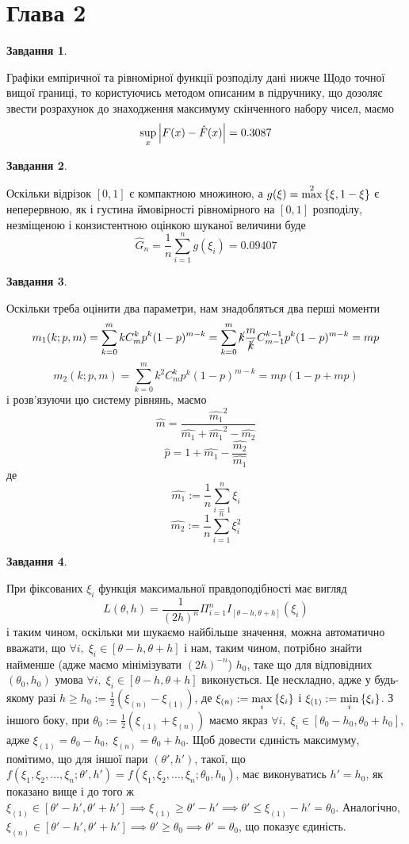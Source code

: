 \documentclass[12pt]{article} %
\newtheorem{prob}{Завдання}
\begin{document}
\section{Глава 2}
\setcounter{prob}{40}
\begin{prob}\end{prob}
	Графіки емпіричної та рівномірної функції розподілу дані нижче
	Щодо точної вищої границі, то користуючись методом описаним в підручнику, що дозоляє звести розрахунок до знаходження максимуму скінченного
	набору чисел, маємо
	\[\sup_x\myabs{F(x)-\hat{F}(x)}=0.3087\]
\begin{prob}\end{prob}
	Оскільки відрізок $[0,1]$ є компактною множиною, а $g(\xi)=\max^2\mycbra{\xi,1-\xi}$ є неперервною, як і густина ймовірності рівномірного
	на $[0,1]$ розподілу, незміщеною і конзистентною оцінкою шуканої величини буде
	\[\hat{G}_n=\frac{1}{n}\sum_{i=1}^ng(\xi_i)=0.09407\]
\begin{prob}\end{prob}
	Оскільки треба оцінити два параметри, нам знадобляться два перші моменти
	\[m_1(k;p,m)=\sum_{k=0}^mkC^k_mp^k(1-p)^{m-k}=\sum_{k=0}^m\cancel{k}\frac{m}{\cancel{k}}C^{k-1}_{m-1}p^k(1-p)^{m-k}=mp\]
	\[m_2(k;p,m)=\sum_{k=0}^mk^2C^k_mp^k(1-p)^{m-k}=mp(1-p+mp)\]
	і розв’язуючи цю систему рівнянь, маємо
	\[\hat{{m}}=\frac{\hat{m_1}^2}{\hat{m_1}+\hat{m_1}^2-\hat{m_2}}\]
	\[\hat{p}=1+\hat{m_1}-\frac{\hat{m_2}}{\hat{m_1}}\]
	де
	\[\hat{m_1}:=\frac{1}{n}\sum_{i=1}^n\xi_i\]
	\[\hat{m_2}:=\frac{1}{n}\sum_{i=1}^n\xi^2_i\]
\begin{prob}\end{prob}
	При фіксованих $\xi_i$ функція максимальної правдоподібності має вигляд
	\[L(\theta,h)=\frac{1}{(2h)^n}\Pi_{i=1}^nI_{[\theta-h,\theta+h]}(\xi_i)\]
	і таким чином, оскільки ми шукаємо найбільше значення, можна автоматично вважати, що $\forall i,\;\xi_i\in[\theta-h,\theta+h]$ і нам,
	таким чином, потрібно знайти найменше (адже маємо мінімізувати $(2h)^{-n}$) $h_0$, таке що для відповідних $(\theta_0,h_0)$ умова
	$\forall i,\;\xi_i\in[\theta-h,\theta+h]$ виконується. Це нескладно, адже у будь-якому разі $h\geq h_0:=\frac{1}{2}(\xi_{(n)}-\xi_{(1)})$, де
	$\xi_{(n)}:=\max_i\mycbra{\xi_i}$ і $\xi_{(1)}:=\min_i\mycbra{\xi_i}$. З іншого боку, при $\theta_0:=\frac{1}{2}(\xi_{(1)}+\xi_{(n)})$
	маємо якраз $\forall i,\;\xi_i\in[\theta_0-h_0,\theta_0+h_0]$, адже $\xi_{(1)}=\theta_0-h_0,\;\xi_{(n)}=\theta_0+h_0$. Щоб довести
	єдиність максимуму, помітимо, що для іншої пари $(\theta',h')$, такої, що $f(\xi_1,\xi_2,\hdots,\xi_n;\theta',h')=
	f(\xi_1,\xi_2,\hdots,\xi_n;\theta_0,h_0)$,
	має виконуватись $h'=h_0$, як показано вище і до того ж $\xi_{(1)}\in[\theta'-h',\theta'+h']\implies\xi_{(1)}\geq\theta'-h'\implies
	\theta'\leq \xi_{(1)}-h'=\theta_0$. Аналогічно, $\xi_{(n)}\in[\theta'-h',\theta'+h']\implies\theta'\geq\theta_0\implies\theta'=\theta_0$,
	що показує єдиність.
\end{document}
